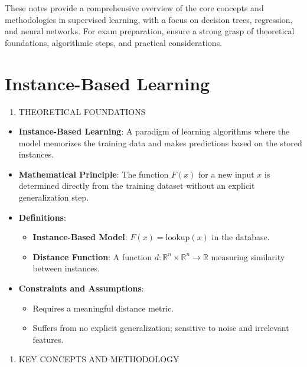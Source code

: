 \documentclass[
  12pt,
]{report}
\providecommand{\tightlist}{%
  \setlength{\itemsep}{0pt}\setlength{\parskip}{0pt}}
\begin{document}
These notes provide a comprehensive overview of the core concepts and methodologies in supervised learning, with a focus on decision trees, regression, and neural networks. For exam preparation, ensure a strong grasp of theoretical foundations, algorithmic steps, and practical considerations.

\chapter{Instance-Based Learning}

\begin{enumerate}
\def\labelenumi{\arabic{enumi}.}
\tightlist
\item
  THEORETICAL FOUNDATIONS
\end{enumerate}

\begin{itemize}
\item
  \textbf{Instance-Based Learning}: A paradigm of learning algorithms where the model memorizes the training data and makes predictions based on the stored instances.
\item
  \textbf{Mathematical Principle}: The function \(F(x)\) for a new input \(x\) is determined directly from the training dataset without an explicit generalization step.
\item
  \textbf{Definitions}:

  \begin{itemize}
  \tightlist
  \item
    \textbf{Instance-Based Model}: \(F(x) = \text{lookup}(x)\) in the database.
  \item
    \textbf{Distance Function}: A function \(d: \mathbb{R}^n \times \mathbb{R}^n \to \mathbb{R}\) measuring similarity between instances.
  \end{itemize}
\item
  \textbf{Constraints and Assumptions}:

  \begin{itemize}
  \tightlist
  \item
    Requires a meaningful distance metric.
  \item
    Suffers from no explicit generalization; sensitive to noise and irrelevant features.
  \end{itemize}
\end{itemize}

\begin{enumerate}
\def\labelenumi{\arabic{enumi}.}
\setcounter{enumi}{1}
\tightlist
\item
  KEY CONCEPTS AND METHODOLOGY
\end{enumerate}
\end{document}
